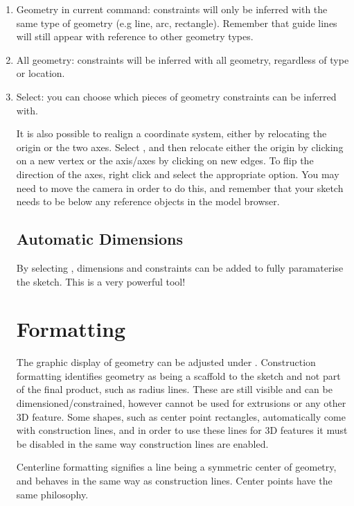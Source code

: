 \begin{enumerate}
    \item Geometry in current command: constraints will only be inferred with the same type of geometry (e.g line, arc, rectangle). Remember that guide lines will still appear with reference to other geometry types.
    \item All geometry: constraints will be inferred with all geometry, regardless of type or location.
    \item Select: you can choose which pieces of geometry constraints can be inferred with.

It is also possible to realign a coordinate system, either by relocating the origin or the two axes. Select , and then relocate either the origin by clicking on a new vertex or the axis/axes by clicking on new edges. To flip the direction of the axes, right click and select the appropriate option. You may need to move the camera in order to do this, and remember that your sketch needs to be below any reference objects in the model browser. 


\subsection{Automatic Dimensions}
By selecting , dimensions and constraints can be added to fully paramaterise the sketch. This is a very powerful tool!

\section{Formatting}

The graphic display of geometry can be adjusted under . Construction formatting identifies geometry as being a scaffold to the sketch and not part of the final product, such as radius lines. These are still visible and can be dimensioned/constrained, however cannot be used for extrusions or any other 3D feature. Some shapes, such as center point rectangles, automatically come with construction lines, and in order to use these lines for 3D features it must be disabled in the same way construction lines are enabled.

Centerline formatting signifies a line being a symmetric center of geometry, and behaves in the same way as construction lines. Center points have the same philosophy.


\end{enumerate}
